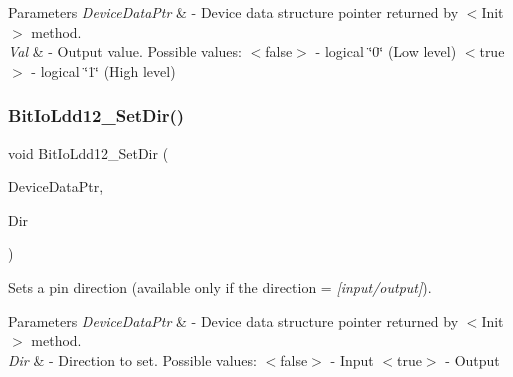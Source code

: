 \begin{DoxyParams}{Parameters}
{\em Device\+Data\+Ptr} & -\/ Device data structure pointer returned by $<$\+Init$>$ method. \\
\hline
{\em Val} & -\/ Output value. Possible values\+: $<$false$>$ -\/ logical \char`\"{}0\char`\"{} (Low level) $<$true$>$ -\/ logical \char`\"{}1\char`\"{} (High level) \\
\hline
\end{DoxyParams}
\mbox{\label{group___bit_io_ldd12__module_ga540c0e8c513ca036a0066aab8833f0ad}} 
\subsubsection{\texorpdfstring{Bit\+Io\+Ldd12\+\_\+\+Set\+Dir()}{BitIoLdd12\_SetDir()}}
{\footnotesize\ttfamily void Bit\+Io\+Ldd12\+\_\+\+Set\+Dir (\begin{DoxyParamCaption}\item[{\hyperlink{group___p_e___types__module_gac5cf1362f1f0e3a2ce71b1bf2276d091}{L\+D\+D\+\_\+\+T\+Device\+Data} $\ast$}]{Device\+Data\+Ptr,  }\item[{\hyperlink{group___p_e___types__module_ga97a80ca1602ebf2303258971a2c938e2}{bool}}]{Dir }\end{DoxyParamCaption})}



Sets a pin direction (available only if the direction = {\itshape \mbox{[}input/output\mbox{]}}). 


\begin{DoxyParams}{Parameters}
{\em Device\+Data\+Ptr} & -\/ Device data structure pointer returned by $<$\+Init$>$ method. \\
\hline
{\em Dir} & -\/ Direction to set. Possible values\+: $<$false$>$ -\/ Input $<$true$>$ -\/ Output \\
\hline
\end{DoxyParams}
\mbox{\label{group___bit_io_ldd12__module_gaf2e24cfdf7dd3071178d0061abb29c56}} 

